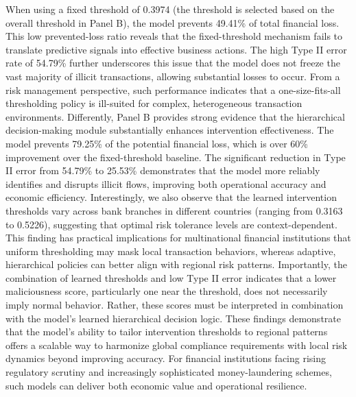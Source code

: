 When using a fixed threshold of 0.3974 (the threshold is selected based on the overall threshold in Panel B), the model prevents 49.41\% of total financial loss. This low prevented-loss ratio reveals that the fixed-threshold mechanism fails to translate predictive signals into effective business actions. The high Type II error rate of 54.79\% further underscores this issue that the model does not freeze the vast majority of illicit transactions, allowing substantial losses to occur. From a risk management perspective, such performance indicates that a one-size-fits-all thresholding policy is ill-suited for complex, heterogeneous transaction environments. Differently, Panel B provides strong evidence that the hierarchical decision-making module substantially enhances intervention effectiveness. The model prevents 79.25\% of the potential financial loss, which is over 60\% improvement over the fixed-threshold baseline. The significant reduction in Type II error from 54.79\% to 25.53\% demonstrates that the model more reliably identifies and disrupts illicit flows, improving both operational accuracy and economic efficiency. Interestingly, we also observe that the learned intervention thresholds vary across bank branches in different countries (ranging from 0.3163 to 0.5226), suggesting that optimal risk tolerance levels are context-dependent. This finding has practical implications for multinational financial institutions that uniform thresholding may mask local transaction behaviors, whereas adaptive, hierarchical policies can better align with regional risk patterns. Importantly, the combination of learned thresholds and low Type II error indicates that a lower maliciousness score, particularly one near the threshold, does not necessarily imply normal behavior. Rather, these scores must be interpreted in combination with the model’s learned hierarchical decision logic. These findings demonstrate that the model’s ability to tailor intervention thresholds to regional patterns offers a scalable way to harmonize global compliance requirements with local risk dynamics beyond improving accuracy. For financial institutions facing rising regulatory scrutiny and increasingly sophisticated money-laundering schemes, such models can deliver both economic value and operational resilience.

